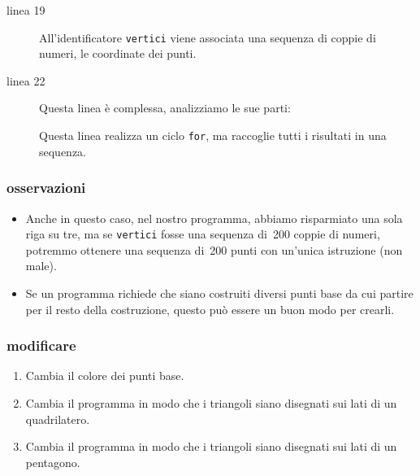 \begin{description}
 \item [linea 19] 
 All'identificatore \lstinline{vertici} viene associata una sequenza di coppie 
di numeri, le coordinate dei punti.
 \item [linea 22] 
 Questa linea è complessa, analizziamo le sue parti:
 Questa linea realizza un ciclo \lstinline{for}, ma raccoglie tutti i risultati 
in una sequenza. 
\end{description}

\subsubsection{osservazioni}

\begin{itemize} [noitemsep]
 \item Anche in questo caso, nel nostro programma, abbiamo risparmiato una sola 
riga su tre, ma se \lstinline{vertici} fosse una sequenza di~200 coppie di 
numeri, potremmo ottenere una sequenza di~200 punti con un'unica istruzione 
(non male).
 \item Se un programma richiede che siano costruiti diversi punti base da cui 
partire per il resto della costruzione, questo può essere un buon modo per 
crearli.
\end{itemize}

\subsubsection{modificare}

\begin{enumerate} [noitemsep]
 \item Cambia il colore dei punti base.
 \item Cambia il programma in modo che i triangoli siano disegnati sui lati di 
un quadrilatero.
 \item Cambia il programma in modo che i triangoli siano disegnati sui lati di 
un pentagono.
\end{enumerate}


